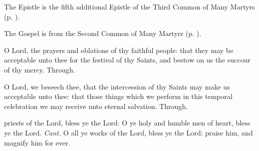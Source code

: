 \begin{rubric}
	The Epistle is the fifth additional Epistle of the Third Common of Many Martyrs (p. \pageref{Hebrews1133}).
\end{rubric}


\begin{rubric}
	The Gospel is from the Second Common of Many Martyrs (p. \pageref{CommonMartyrsIIGospel}).
\end{rubric}


\vspace{-0.25\baselineskip}

\secret

\vspace{-0.1\baselineskip}

 O Lord, the prayers and oblations of thy faithful people: that they may be acceptable unto thee for the festival of thy Saints, and bestow on us the succour of thy mercy. Through.


\vspace{-0.25\baselineskip}

\postcommunion

\vspace{-0.1\baselineskip}

 O Lord, we beseech thee, that the intercession of thy Saints may make us acceptable unto thee: that those things which we perform in this temporal celebration we may receive unto eternal salvation. Through.


\clearpage
{}

\introit
{} priests of the Lord, bless ye the Lord: O ye holy and humble
men of heart, bless ye the Lord. \textit{Cant.} O all ye works of the Lord, bless ye the Lord: praise him, and magnify him for ever.

